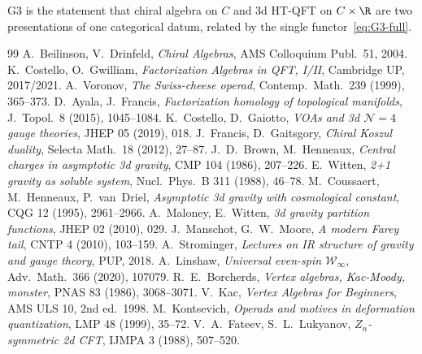\documentclass{article}
\theoremstyle{definition}
\theoremstyle{remark}
\begin{document}
G3 is the statement that chiral algebra on $C$ and 3d HT-QFT on
$C\times\R$ are two presentations of one categorical datum, related
by the single functor~\eqref{eq:G3-full}.

\begin{thebibliography}{99}
 A.~Beilinson, V.~Drinfeld, \emph{Chiral Algebras},
 AMS Colloquium Publ.~51, 2004.
 K.~Costello, O.~Gwilliam, \emph{Factorization Algebras
 in QFT, I/II}, Cambridge UP, 2017/2021.
 A.~Voronov, \emph{The Swiss-cheese operad},
 Contemp.~Math.~239 (1999), 365--373.
 D.~Ayala, J.~Francis, \emph{Factorization homology of
 topological manifolds}, J.~Topol.~8 (2015), 1045--1084.
 K.~Costello, D.~Gaiotto, \emph{VOAs and 3d
 \(\mathcal N=4\) gauge theories}, JHEP 05 (2019), 018.
 J.~Francis, D.~Gaitsgory, \emph{Chiral Koszul duality},
 Selecta Math.~18 (2012), 27--87.
 J.~D.~Brown, M.~Henneaux, \emph{Central charges
 in asymptotic 3d gravity}, CMP 104 (1986), 207--226.
 E.~Witten, \emph{2+1 gravity as soluble
 system}, Nucl.~Phys.~B 311 (1988), 46--78.
 M.~Coussaert, M.~Henneaux, P.~van~Driel,
 \emph{Asymptotic 3d gravity with cosmological constant},
 CQG 12 (1995), 2961--2966.
 A.~Maloney, E.~Witten, \emph{3d gravity
 partition functions}, JHEP 02 (2010), 029.
 J.~Manschot, G.~W.~Moore, \emph{A modern
 Farey tail}, CNTP 4 (2010), 103--159.
 A.~Strominger, \emph{Lectures on IR
 structure of gravity and gauge theory}, PUP, 2018.
 A.~Linshaw, \emph{Universal even-spin
 \(\mathcal W_\infty\)}, Adv.~Math.~366 (2020), 107079.
 R.~E.~Borcherds, \emph{Vertex algebras,
 Kac-Moody, monster}, PNAS 83 (1986), 3068--3071.
 V.~Kac, \emph{Vertex Algebras for Beginners},
 AMS ULS 10, 2nd ed.~1998.
 M.~Kontsevich, \emph{Operads and
 motives in deformation quantization}, LMP 48 (1999), 35--72.
 V.~A.~Fateev, S.~L.~Lukyanov,
 \emph{\(Z_n\)-symmetric 2d CFT}, IJMPA 3 (1988), 507--520.
\end{thebibliography}
\end{document}
